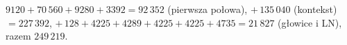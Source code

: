 \begin{przyklad}\label{prz:suma-kontrola}
$9120+70\,560+9280+3392=92\,352$ (pierwsza połowa), $+\,135\,040$ (kontekst) $=227\,392$, $+\,128+4225+4289+4225+4225+4735=21\,827$ (głowice i LN), razem $249\,219$.
\end{przyklad}

